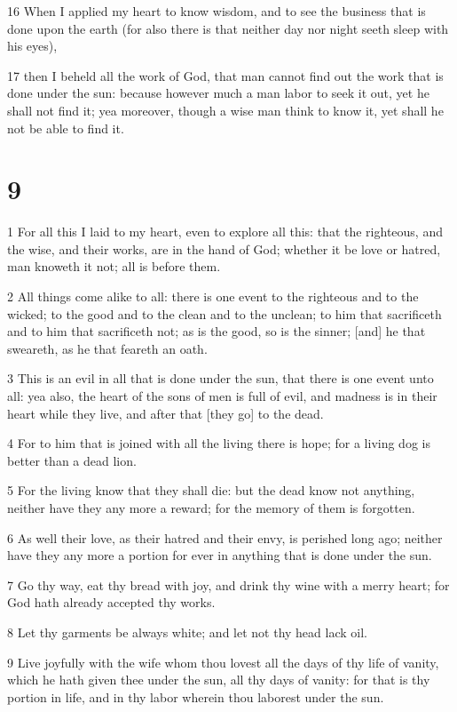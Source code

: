 \par 16 When I applied my heart to know wisdom, and to see the business that is done upon the earth (for also there is that neither day nor night seeth sleep with his eyes),
\par 17 then I beheld all the work of God, that man cannot find out the work that is done under the sun: because however much a man labor to seek it out, yet he shall not find it; yea moreover, though a wise man think to know it, yet shall he not be able to find it.

\chapter{9}

\par 1 For all this I laid to my heart, even to explore all this: that the righteous, and the wise, and their works, are in the hand of God; whether it be love or hatred, man knoweth it not; all is before them.
\par 2 All things come alike to all: there is one event to the righteous and to the wicked; to the good and to the clean and to the unclean; to him that sacrificeth and to him that sacrificeth not; as is the good, so is the sinner; [and] he that sweareth, as he that feareth an oath.
\par 3 This is an evil in all that is done under the sun, that there is one event unto all: yea also, the heart of the sons of men is full of evil, and madness is in their heart while they live, and after that [they go] to the dead.
\par 4 For to him that is joined with all the living there is hope; for a living dog is better than a dead lion.
\par 5 For the living know that they shall die: but the dead know not anything, neither have they any more a reward; for the memory of them is forgotten.
\par 6 As well their love, as their hatred and their envy, is perished long ago; neither have they any more a portion for ever in anything that is done under the sun.
\par 7 Go thy way, eat thy bread with joy, and drink thy wine with a merry heart; for God hath already accepted thy works.
\par 8 Let thy garments be always white; and let not thy head lack oil.
\par 9 Live joyfully with the wife whom thou lovest all the days of thy life of vanity, which he hath given thee under the sun, all thy days of vanity: for that is thy portion in life, and in thy labor wherein thou laborest under the sun.
